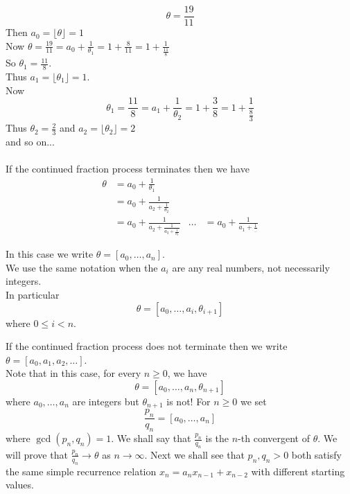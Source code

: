 \documentclass[NumTh.tex]{subfiles}
\begin{document}
\begin{ex*}
  \[\theta = \frac{19}{11}\]
  Then $a_0 = \lfloor \theta \rfloor = 1$\\
  Now $\theta = \frac{19}{11} = a_0 + \frac{1}{\theta_1} = 1 + \frac{8}{11} = 1 + \frac{1}{\frac{11}{8}}$\\
  So $\theta_1 = \frac{11}{8}$.\\
  Thus $a_1 = \lfloor \theta_1 \rfloor = 1$.\\
  Now 
  \[ \theta_1 = \frac{11}{8} = a_1 + \frac{1}{\theta_2} = 1 + \frac{3}{8} = 1 + \frac{1}{\frac{8}{3}} \]
  Thus $\theta_2 = \frac{2}{3}$ and $a_2 = \lfloor \theta_2 \rfloor = 2$\\
  and so on...\\
  \\
  If the continued fraction process terminates then we have
  \begin{align}
  \theta &= a_0 + \frac{1}{\theta_1}\\
  &= a_0 + \frac{1}{a_2 + \frac{1}{\theta_2}}\\
  &= a_0 + \frac{1}{a_2 + \frac{1}{a_3 + \frac{1}{\theta_3}}}
  & \dots
  &= a_0 + \frac{1}{a_1 + \frac{1}{..}}%
  \end{align}
  
  In this case we write $\theta = [a_0,\dots,a_n]$.\\
  We use the same notation when the $a_i$ are any real numbers, not necessarily integers.\\
  In particular
  \[ \theta = [a_0,\dots,a_i,\theta_{i+1}] \]
  where $0 \leq i < n$.
\end{ex*}

If the continued fraction process does not terminate then we write $\theta = [a_0,a_1,a_2,\dots]$.\\
Note that in this case, for every $n \geq 0$, we have 
\[ \theta = [a_0,\dots, a_n,\theta_{n+1}] \]
where $a_0,\dots,a_n$ are integers but $\theta_{n+1}$ is not!
For $n \geq 0$ we set 
\[ \frac{p_n}{q_n} = [a_0,\dots,a_n] \] 
where $\gcd(p_n,q_n) = 1$.
We shall say that $\frac{p_n}{q_n}$ is the $n$-th convergent of $\theta$.
We will prove that $\frac{p_n}{q_n} \to \theta$ as $n \to \infty$.
Next we shall see that  $p_n,q_n > 0$ both satisfy the same simple recurrence relation $x_n = a_n x_{n-1} + x_{n-2}$ with different starting values.
\end{document}
